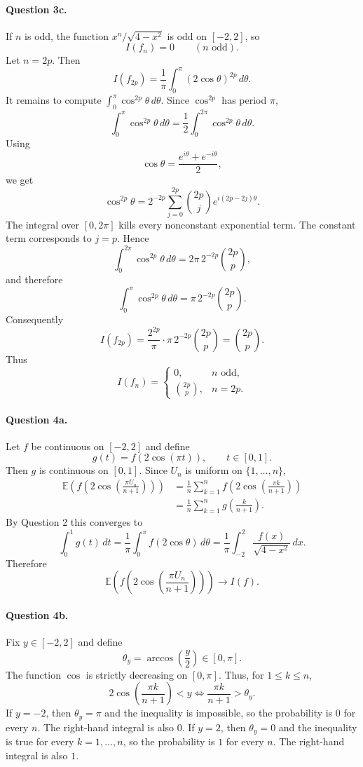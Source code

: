\documentclass[11pt,a4paper]{article}
\newcommand{\E}{\mathbb{E}}
\begin{document}
\paragraph{Question 3c.}
If $n$ is odd, the function $x^n/\sqrt{4-x^2}$ is odd on $[-2,2]$, so
\[
  \boxed{I(f_n)=0\qquad(n\text{ odd}).}
\]
Let $n=2p$.  Then
\[
  I(f_{2p})=\frac1\pi\int_0^\pi (2\cos\theta)^{2p}\,d\theta.
\]
It remains to compute $\int_0^\pi\cos^{2p}\theta\,d\theta$.  Since $\cos^{2p}$ has period $\pi$,
\[
  \int_0^\pi \cos^{2p}\theta\,d\theta
  =\frac12\int_0^{2\pi}\cos^{2p}\theta\,d\theta.
\]
Using
\[
  \cos\theta=\frac{e^{i\theta}+e^{-i\theta}}2,
\]
we get
\[
  \cos^{2p}\theta
  =2^{-2p}\sum_{j=0}^{2p}\binom{2p}{j}e^{i(2p-2j)\theta}.
\]
The integral over $[0,2\pi]$ kills every nonconstant exponential term.  The constant term corresponds to $j=p$. Hence
\[
  \int_0^{2\pi}\cos^{2p}\theta\,d\theta
  =2\pi\,2^{-2p}\binom{2p}{p},
\]
and therefore
\[
  \int_0^\pi\cos^{2p}\theta\,d\theta
  =\pi\,2^{-2p}\binom{2p}{p}.
\]
Consequently
\[
  I(f_{2p})=\frac{2^{2p}}\pi\cdot \pi\,2^{-2p}\binom{2p}{p}
  =\binom{2p}{p}.
\]
Thus
\[
  \boxed{
  I(f_n)=
  \begin{cases}
  0,& n\text{ odd},\\[1mm]
  \displaystyle \binom{2p}{p},& n=2p.
  \end{cases}}
\]

\paragraph{Question 4a.}
Let $f$ be continuous on $[-2,2]$ and define
\[
  g(t)=f(2\cos(\pi t)),\qquad t\in[0,1].
\]
Then $g$ is continuous on $[0,1]$. Since $U_n$ is uniform on $\{1,\dots,n\}$,
\[
\begin{aligned}
 \E\left(f\left(2\cos\left(\frac{\pi U_n}{n+1}\right)\right)\right)
 &=\frac1n\sum_{k=1}^n f\left(2\cos\left(\frac{\pi k}{n+1}\right)\right)\\
 &=\frac1n\sum_{k=1}^n g\left(\frac{k}{n+1}\right).
\end{aligned}
\]
By Question 2 this converges to
\[
  \int_0^1 g(t)\,dt
  =\frac1\pi\int_0^\pi f(2\cos\theta)\,d\theta
  =\frac1\pi\int_{-2}^2\frac{f(x)}{\sqrt{4-x^2}}\,dx.
\]
Therefore
\[
  \boxed{
  \E\left(f\left(2\cos\left(\frac{\pi U_n}{n+1}\right)\right)\right)
  \longrightarrow I(f).}
\]

\paragraph{Question 4b.}
Fix $y\in[-2,2]$ and define
\[
  \theta_y=\arccos\left(\frac y2\right)\in[0,\pi].
\]
The function $\cos$ is strictly decreasing on $[0,\pi]$.  Thus, for $1\le k\le n$,
\[
  2\cos\left(\frac{\pi k}{n+1}\right)<y
  \iff
  \frac{\pi k}{n+1}>\theta_y.
\]
If $y=-2$, then $\theta_y=\pi$ and the inequality is impossible, so the probability is $0$ for every $n$.  The right-hand integral is also $0$.
If $y=2$, then $\theta_y=0$ and the inequality is true for every $k=1,\dots,n$, so the probability is $1$ for every $n$.  The right-hand integral is also $1$.
\end{document}
